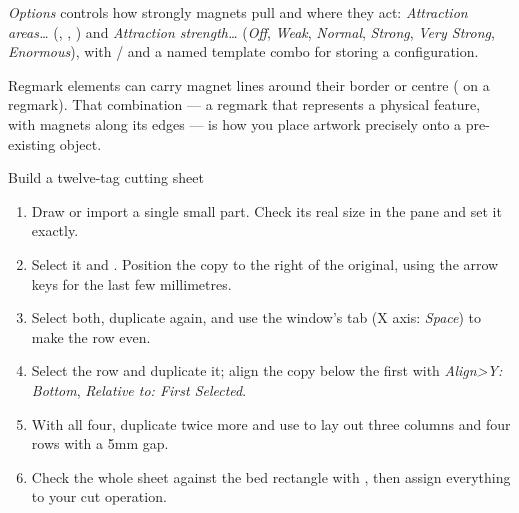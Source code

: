 \noindent \emph{Options} controls how strongly magnets pull and where they act:
\emph{Attraction areas\dots} (, ,
) and \emph{Attraction strength\dots} (\emph{Off}, \emph{Weak},
\emph{Normal}, \emph{Strong}, \emph{Very Strong}, \emph{Enormous}), with
/ and a named template combo for storing a configuration.

\noindent Regmark elements can carry magnet lines around their border or centre
( on a regmark). That combination --- a regmark that
represents a physical feature, with magnets along its edges --- is how you place
artwork precisely onto a pre-existing object.

\begin{tryit}{Build a twelve-tag cutting sheet}
\begin{enumerate}[label=\arabic*.,leftmargin=1.4em]
  \item Draw or import a single small part. Check its real size in the
         pane and set it exactly.
  \item Select it and . Position the copy
        to the right of the original, using the arrow keys for the last few
        millimetres.
  \item Select both, duplicate again, and use the  window's
         tab (X axis: \emph{Space}) to make the row even.
  \item Select the row and duplicate it; align the copy below the first with
        \emph{Align>Y: Bottom}, \emph{Relative to: First Selected}.
  \item With all four, duplicate twice more and use  to lay out
        three columns and four rows with a 5\unit{mm} gap.
  \item Check the whole sheet against the bed rectangle with , then
        assign everything to your cut operation.
\end{enumerate}
\end{tryit}
